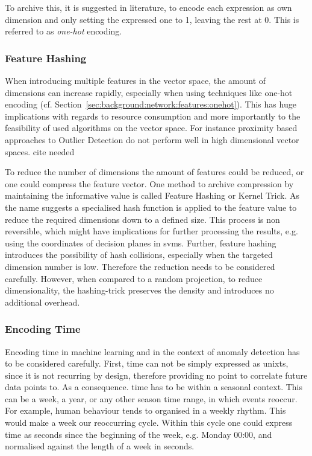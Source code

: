 To archive this, it is suggested in literature, to encode each expression as own dimension and only setting the expressed one to 1, leaving the rest at 0. This is referred to as \emph{one-hot} encoding. \parencite[cf.][]{Coates2011}

\subsubsection{Feature Hashing}
\label{sec:background:network:features:hashing}

When introducing multiple features in the vector space, the  amount of dimensions can increase rapidly, especially when using techniques like one-hot encoding (cf. Section~\ref{sec:background:network:features:onehot}).
This has huge implications with regards to resource consumption and more importantly to the feasibility of used algorithms on the vector space.
For instance proximity based approaches to Outlier Detection do not perform well in high dimensional vector spaces. \alert{cite needed}

To reduce the number of dimensions the amount of features could be reduced, or one could compress the feature vector. One method to archive compression by maintaining the informative value is called Feature Hashing or Kernel Trick. \parencite{Weinberger2009,Shi2009}
As the name suggests a specialised hash function is applied to the feature value to reduce the required dimensions down to a defined size.
This process is non reversible, which might have implications for further processing the results, e.g. using the coordinates of decision planes in \glspl{svm}.
Further, feature hashing introduces the possibility of hash collisions, especially when the targeted dimension number is low. Therefore the reduction needs to be considered carefully.
However, when compared to a random projection, to reduce dimensionality, the hashing-trick preserves the density and introduces no additional overhead. \parencite{Weinberger2009,Shi2009}

\subsubsection{Encoding Time}
\label{sec:background:network:features:time}

Encoding time in machine learning and in the context of anomaly detection has to be considered carefully.
First, time can not be simply expressed as \gls{unixts}, since it is not recurring by design, therefore providing no point to correlate future data points to.
As a consequence. time has to be within a seasonal context. This can be a week, a year, or any other season time range, in which events reoccur.
For example, human behaviour tends to organised in a weekly rhythm. This would make a week our reoccurring cycle. Within this cycle one could express time as seconds since the beginning of the week, e.g. Monday 00:00, and normalised against the length of a week in seconds.

